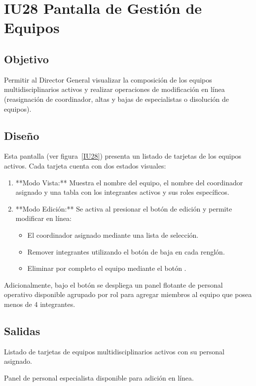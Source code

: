 \section{IU28 Pantalla de Gestión de Equipos}

\subsection{Objetivo}
	Permitir al Director General visualizar la composición de los equipos multidisciplinarios activos y realizar operaciones de modificación en línea (reasignación de coordinador, altas y bajas de especialistas o disolución de equipos).

\subsection{Diseño}
	Esta pantalla  (ver figura~\ref{IU28}) presenta un listado de tarjetas de los equipos activos. Cada tarjeta cuenta con dos estados visuales:
	\begin{enumerate}
		\item **Modo Vista:** Muestra el nombre del equipo, el nombre del coordinador asignado y una tabla con los integrantes activos y sus roles específicos.
		\item **Modo Edición:** Se activa al presionar el botón de edición  y permite modificar en línea:
			\begin{itemize}
				\item El coordinador asignado mediante una lista de selección.
				\item Remover integrantes utilizando el botón de baja  en cada renglón.
				\item Eliminar por completo el equipo mediante el botón .
			\end{itemize}
	\end{enumerate}
	Adicionalmente, bajo el botón \IUbutton{+} se despliega un panel flotante de personal operativo disponible agrupado por rol para agregar miembros al equipo que posea menos de 4 integrantes.


\subsection{Salidas}
	\begin{Citemize}
		\item Listado de tarjetas de equipos multidisciplinarios activos con su personal asignado.
		\item Panel de personal especialista disponible para adición en línea.
	\end{Citemize}


